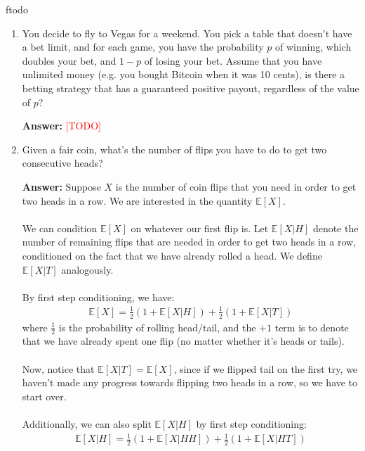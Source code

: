 ƒtodo\documentclass{article}
\newenvironment{QandA}{\begin{enumerate}[label=\arabic*.]}{\end{enumerate}}
\newenvironment{answer}{\par\normalfont \textbf{Answer:}}{}
\newcommand{\Exp}[1]{\mathbb{E}\left[ #1 \right]}
\newcommand{\g}{\vert}
\newcommand{\todo}{\textcolor{red}{[TODO]}}
\begin{document}
\begin{QandA}
\begin{answer}
        (Source: \href{https://en.wikipedia.org/wiki/Birthday_problem}{Wikipedia})
    \end{answer}

    \item You decide to fly to Vegas for a weekend. You pick a table that doesn't have a bet limit, and for each game, you have the probability $p$ of winning, which doubles your bet, and $1-p$ of losing your bet. Assume that you have unlimited money (e.g. you bought Bitcoin when it was 10 cents), is there a betting strategy that has a guaranteed positive payout, regardless of the value of $p$?
    \begin{answer}
        \todo
    \end{answer}
    
    \item Given a fair coin, what’s the number of flips you have to do to get two consecutive heads?
    \begin{answer}
        Suppose $X$ is the number of coin flips that you need in order to get two heads in a row. We are interested in the quantity $\Exp{X}$. \\\\
        We can condition $\Exp{X}$ on whatever our first flip is. Let $\Exp{X \g H}$ denote the number of remaining flips that are needed in order to get two heads in a row, conditioned on the fact that we have already rolled a head. We define $\Exp{X \g T}$ analogously. \\\\
        By first step conditioning, we have:
        \begin{align*}
            \Exp{X} = \frac{1}{2}\left( 1 + \Exp{X \g H} \right) + \frac{1}{2}\left( 1 + \Exp{X \g T} \right)
        \end{align*}
        where $\frac{1}{2}$ is the probability of rolling head/tail, and the $+ 1$ term is to denote that we have already spent one flip (no matter whether it's heads or tails). \\\\
        Now, notice that $\Exp{X \g T} = \Exp{X}$, since if we flipped tail on the first try, we haven't made any progress towards flipping two heads in a row, so we have to start over. \\\\
        Additionally, we can also split $\Exp{X \g H}$ by first step conditioning:
        \begin{align*}
            \Exp{X \g H} = \frac{1}{2} \left(1 + \Exp{X \g HH} \right) + \frac{1}{2} \left(1 + \Exp{X \g HT} \right)

\end{align*}
\end{answer}
\end{QandA}
\end{document}
